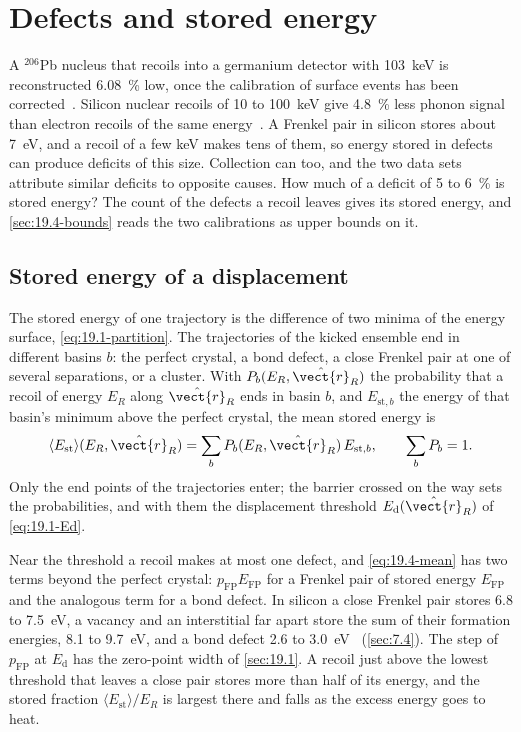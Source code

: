\section{Defects and stored energy}\label{sec:19.4}

A $^{206}$Pb nucleus that recoils into a germanium detector with \SI{103}{keV} is reconstructed \SI{6.08}{\percent} low, once the calibration of surface events has been corrected~\cite{agnese2018energy}. Silicon nuclear recoils of 10 to \SI{100}{keV} give \SI{4.8}{\percent} less phonon signal than electron recoils of the same energy~\cite{agnese2018nuclear}. A Frenkel pair in silicon stores about \SI{7}{eV}, and a recoil of a few keV makes tens of them, so energy stored in defects can produce deficits of this size. Collection can too, and the two data sets attribute similar deficits to opposite causes. How much of a deficit of 5 to \SI{6}{\percent} is stored energy? The count of the defects a recoil leaves gives its stored energy, and \cref{sec:19.4-bounds} reads the two calibrations as upper bounds on it.

\subsection{Stored energy of a displacement}\label{sec:19.4-single}

The stored energy of one trajectory is the difference of two minima of the energy surface, \cref{eq:19.1-partition}. The trajectories of the kicked ensemble end in different basins $b$: the perfect crystal, a bond defect, a close Frenkel pair at one of several separations, or a cluster. With $P_b(E_R, \hat{\vect{r}}_R)$ the probability that a recoil of energy $E_R$ along $\hat{\vect{r}}_R$ ends in basin $b$, and $E_{\mathrm{st},b}$ the energy of that basin's minimum above the perfect crystal, the mean stored energy is
\begin{equation}
  \langle E_{\mathrm{st}}\rangle(E_R, \hat{\vect{r}}_R) = \sum_bP_b(E_R, \hat{\vect{r}}_R)\,E_{\mathrm{st},b} , \qquad \sum_bP_b = 1 .
  \label{eq:19.4-mean}
\end{equation}
Only the end points of the trajectories enter; the barrier crossed on the way sets the probabilities, and with them the displacement threshold $E_{\mathrm{d}}(\hat{\vect{r}}_R)$ of \cref{eq:19.1-Ed}.

Near the threshold a recoil makes at most one defect, and \cref{eq:19.4-mean} has two terms beyond the perfect crystal: $p_{\mathrm{FP}}E_{\mathrm{FP}}$ for a Frenkel pair of stored energy $E_{\mathrm{FP}}$ and the analogous term for a bond defect. In silicon a close Frenkel pair stores 6.8 to \SI{7.5}{eV}, a vacancy and an interstitial far apart store the sum of their formation energies, 8.1 to \SI{9.7}{eV}, and a bond defect 2.6 to \SI{3.0}{eV}~\cite[Table~III]{holmstrom2008threshold} (\cref{sec:7.4}). The step of $p_{\mathrm{FP}}$ at $E_{\mathrm{d}}$ has the zero-point width of \cref{sec:19.1}. A recoil just above the lowest threshold that leaves a close pair stores more than half of its energy, and the stored fraction $\langle E_{\mathrm{st}}\rangle/E_R$ is largest there and falls as the excess energy goes to heat.

